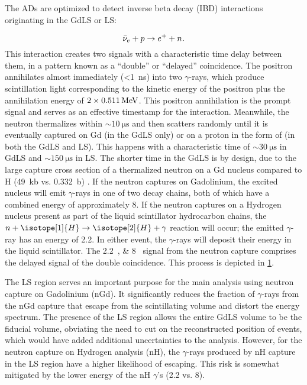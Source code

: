 The ADs are optimized to detect inverse beta decay (IBD) interactions
originating in the GdLS or LS:

\begin{equation}
    \bar{\nu}_e + p \to e^+ + n.
\end{equation}
This interaction creates two signals with a characteristic
time delay between them, in a pattern known as a ``double''
or ``delayed'' coincidence.
The positron annihilates almost immediately (\SI{<1}{\nano\second})
into two $\gamma$-rays, which produce scintillation light
corresponding to the kinetic energy of the positron plus the
annihilation energy of $2\times \SI{0.511}{\mega\electronvolt}$.
This positron annihilation is the prompt signal
and serves as an effective timestamp for the interaction.
Meanwhile, the neutron thermalizes within $\sim \SI{10}{\micro\second}$
and then scatters randomly until it is eventually captured
on Gd (in the GdLS only) or on a proton in the form of 
(in both the GdLS and LS).
This happens with a characteristic time of $\sim \SI{30}{\micro\second}$
in GdLS and $\sim \SI{150}{\micro\second}$ in LS.
The shorter time in the GdLS is by design,
due to the large capture cross section of a thermalized neutron
on a Gd nucleus compared to H (\SI{49}{\kilo\barn} vs. \SI{0.332}{\barn})
\cite{gdls2014}.
If the neutron captures on Gadolinium, the excited nucleus
will emit $\gamma$-rays in one of two decay chains,
both of which have a combined energy of approximately \SI{8}{\mev}.
If the neutron captures on a Hydrogen nucleus present as part of
the liquid scintillator hydrocarbon chains,
the $n+\isotope[1]{H} \to \isotope[2]{H} + \gamma$ reaction will occur;
the emitted $\gamma$-ray has an energy of \SI{2.2}{\mev}.
In either event, the $\gamma$-rays will deposit their energy
in the liquid scintillator.
The \SIlist[list-pair-separator = { or }]{2.2;8}{\mev} signal
from the neutron capture comprises the delayed signal of the
double coincidence.
This process is depicted in \cref{fig:ibd_cartoon}.

\begin{figure}
    \label{fig:ibd_cartoon}
\end{figure}

The LS region serves an important purpose for the main \thetaot
analysis using neutron capture on Gadolinium (nGd).
It significantly reduces the fraction of $\gamma$-rays from the nGd capture
that escape from the scintillating volume and distort the energy spectrum.
The presence of the LS region allows the entire GdLS volume to be
the fiducial volume, obviating the need to cut on the reconstructed position
of events, which would have added additional uncertainties to the analysis.
However, for the neutron capture on Hydrogen analysis (nH),
the $\gamma$-rays produced by nH capture in the LS region
have a higher likelihood of escaping.
This risk is somewhat mitigated by the lower energy of the nH $\gamma$'s
(\SI{2.2}{\mev} vs. \SI{8}{\mev}).


